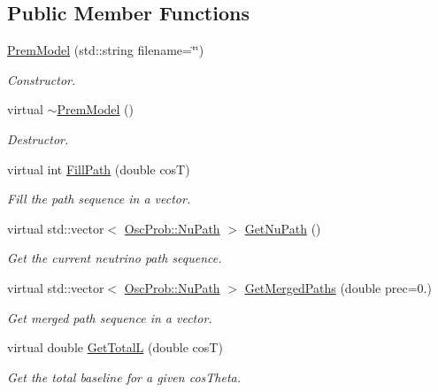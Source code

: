 \subsection*{Public Member Functions}
\begin{DoxyCompactItemize}
\item 
\hyperlink{classOscProb_1_1PremModel_a959f8da5c78881b950bd647b67c1ef9b}{Prem\+Model} (std\+::string filename=\char`\"{}\char`\"{})
\begin{DoxyCompactList}\small\item\em Constructor. \end{DoxyCompactList}\item 
virtual \hyperlink{classOscProb_1_1PremModel_aac484ca4e607f2b0fc6f599358cb95fb}{$\sim$\+Prem\+Model} ()
\begin{DoxyCompactList}\small\item\em Destructor. \end{DoxyCompactList}\item 
virtual int \hyperlink{classOscProb_1_1PremModel_ac69162cc5e3c8b7c1b8a85571ff2063b}{Fill\+Path} (double cosT)
\begin{DoxyCompactList}\small\item\em Fill the path sequence in a vector. \end{DoxyCompactList}\item 
virtual std\+::vector$<$ \hyperlink{structOscProb_1_1NuPath}{Osc\+Prob\+::\+Nu\+Path} $>$ \hyperlink{classOscProb_1_1PremModel_adbe7a5df260cba3923f5cbcb8ab2f03f}{Get\+Nu\+Path} ()
\begin{DoxyCompactList}\small\item\em Get the current neutrino path sequence. \end{DoxyCompactList}\item 
virtual std\+::vector$<$ \hyperlink{structOscProb_1_1NuPath}{Osc\+Prob\+::\+Nu\+Path} $>$ \hyperlink{classOscProb_1_1PremModel_a5b6f83f2e9b7087e8faad1f19f00ebd5}{Get\+Merged\+Paths} (double prec=0.)
\begin{DoxyCompactList}\small\item\em Get merged path sequence in a vector. \end{DoxyCompactList}\item 
virtual double \hyperlink{classOscProb_1_1PremModel_ae258b41cca80631e3041f0421b25afeb}{Get\+TotalL} (double cosT)
\begin{DoxyCompactList}\small\item\em Get the total baseline for a given cos\+Theta. \end{DoxyCompactList}\item 

\end{DoxyCompactItemize}
